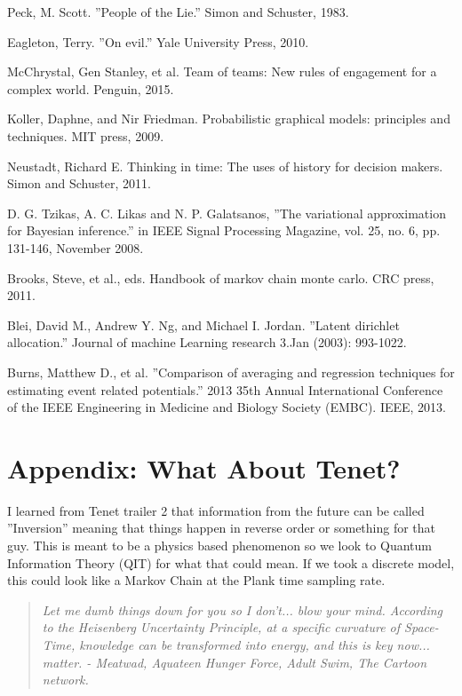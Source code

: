 \documentclass{article}
\begin{document}
\newpage
\begin{thebibliography}{9}

Peck, M. Scott. ''People of the Lie.'' Simon and Schuster, 1983.

Eagleton, Terry. ''On evil.'' Yale University Press, 2010.

McChrystal, Gen Stanley, et al. Team of teams: New rules of engagement for a complex world. Penguin, 2015.

Koller, Daphne, and Nir Friedman. Probabilistic graphical models: principles and techniques. MIT press, 2009.

Neustadt, Richard E. Thinking in time: The uses of history for decision makers. Simon and Schuster, 2011.

D. G. Tzikas, A. C. Likas and N. P. Galatsanos, ''The variational approximation for Bayesian inference.'' in IEEE Signal Processing Magazine, vol. 25, no. 6, pp. 131-146, November 2008.

Brooks, Steve, et al., eds. Handbook of markov chain monte carlo. CRC press, 2011.

Blei, David M., Andrew Y. Ng, and Michael I. Jordan. ''Latent dirichlet allocation.'' Journal of machine Learning research 3.Jan (2003): 993-1022.

Burns, Matthew D., et al. ''Comparison of averaging and regression techniques for estimating event related potentials.'' 2013 35th Annual International Conference of the IEEE Engineering in Medicine and Biology Society (EMBC). IEEE, 2013.
\end{thebibliography}
\twocolumn

\section{Appendix: What About Tenet?}

\large
I learned from Tenet trailer 2 that information from the future can be called ''Inversion'' meaning that things happen in reverse order or something for that guy. This is meant to be a physics based phenomenon so we look to Quantum Information Theory (QIT) for what that could mean. If we took a discrete model, this could look like a Markov Chain at the Plank time sampling rate.

\begin{quote}
   \emph{ Let me dumb things down for you so I don't... blow your mind. According to the Heisenberg Uncertainty Principle, at a specific curvature of Space-Time, knowledge can be transformed into energy, and this is key now... matter. - Meatwad, Aquateen Hunger Force, Adult Swim, The Cartoon network. }
\end{quote}
\end{document}
